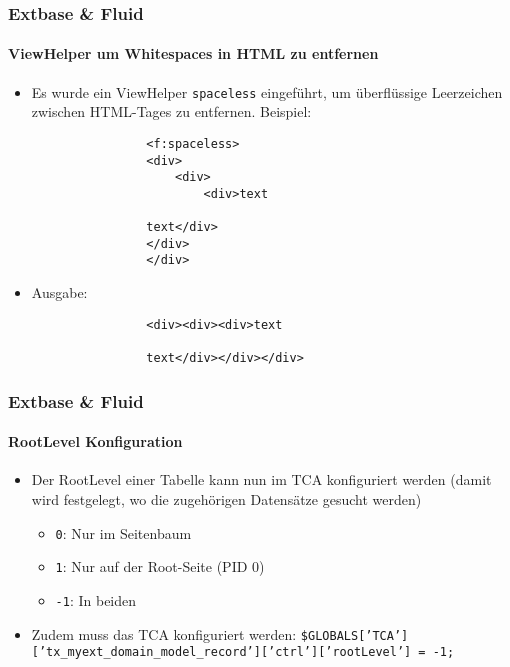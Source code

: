 \begin{frame}[fragile]
	\frametitle{Extbase \& Fluid}
	\framesubtitle{ViewHelper um Whitespaces in HTML zu entfernen}

	\begin{itemize}

		\item Es wurde ein ViewHelper \texttt{spaceless} eingeführt, um überflüssige
			Leerzeichen zwischen HTML-Tages zu entfernen. Beispiel:

			\begin{lstlisting}
				<f:spaceless>
				<div>
				    <div>
				        <div>text

				text</div>
				</div>
				</div>
			\end{lstlisting}

		\item Ausgabe:

			\begin{lstlisting}
				<div><div><div>text

				text</div></div></div>
			\end{lstlisting}

	\end{itemize}

\end{frame}


\begin{frame}[fragile]
	\frametitle{Extbase \& Fluid}
	\framesubtitle{RootLevel Konfiguration}

	\lstset{basicstyle=\small\ttfamily}

	\begin{itemize}

		\item Der RootLevel einer Tabelle kann nun im TCA konfiguriert werden\newline
			\small(damit wird festgelegt, wo die zugehörigen Datensätze gesucht werden)\normalsize

			\begin{itemize}
				\item \texttt{0}: Nur im Seitenbaum
				\item \texttt{1}: Nur auf der Root-Seite (PID 0)
				\item \texttt{-1}: In beiden
			\end{itemize}

		\item Zudem muss das TCA konfiguriert werden:\newline
			\tiny
				\texttt{\$GLOBALS['TCA']['tx\_myext\_domain\_model\_record']['ctrl']['rootLevel'] = -1;}
			\normalsize

	\end{itemize}

\end{frame}

